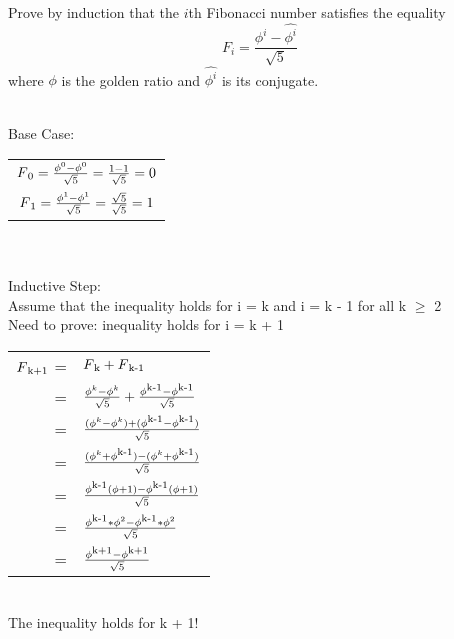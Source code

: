 \documentclass[addpoints,11pt]{exam}
\begin{document}
\begin{questions}
		\question[5]
		Prove by induction that the $i$th Fibonacci number satisfies the equality
		$$F_i = \frac{\phi^i - \hat{\phi^i}}{\sqrt{5}}$$
		where $\phi$ is the golden ratio and $\hat{\phi^i}$ is its conjugate.
		\begin{solutionorbox}\\
			Base Case:\\
			\begin{tabular}{c}
				\qquad $F\textsubscript{0} = \frac{\phi^0 - \phi^0}{\sqrt{5}} = \frac{1 - 1}{\sqrt{5}} = 0$\\
				\qquad $F\textsubscript{1} = \frac{\phi^1 - \phi^1}{\sqrt{5}} = \frac{\sqrt{5}}{\sqrt{5}} = 1$\\
			\end{tabular} \\ \\ 
			Inductive Step:\\ Assume that the inequality holds for i = k and i = k - 1 for all k $\geq$ 2\\
			Need to prove: inequality holds for i = k + 1\\
			\begin{tabular}{r l}
				$F\textsubscript{k+1}$ = & $F\textsubscript{k} + F\textsubscript{k-1}$ \\
				= & $\frac{\phi^k-\phi^k}{\sqrt{5}} + \frac{\phi\textsuperscript{k-1}-\phi\textsuperscript{k-1}}{\sqrt{5}}$\\
				= & $\frac{(\phi^k-\phi^k) + (\phi\textsuperscript{k-1}-\phi\textsuperscript{k-1})}{\sqrt{5}}$\\
				= & $\frac{(\phi^k + \phi\textsuperscript{k-1}) - (\phi^k + \phi\textsuperscript{k-1})}{\sqrt{5}}$\\
				= & $\frac{\phi\textsuperscript{k-1}(\phi + 1) - \phi\textsuperscript{k-1}(\phi + 1)}{\sqrt{5}}$\\
				= & $\frac{\phi\textsuperscript{k-1}*\phi^2 - \phi\textsuperscript{k-1} * \phi^2}{\sqrt{5}}$\\
				= & $\frac{\phi\textsuperscript{k+1} - \phi\textsuperscript{k+1}}{\sqrt{5}}$\\
			\end{tabular}\\
			The inequality holds for k + 1!
		\end{solutionorbox}
		
		\ifprintanswers
		\newpage
		\else
		\bigskip
		\fi
		

\end{questions}
\end{document}
